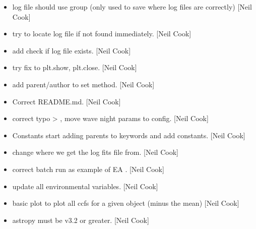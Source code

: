 \documentclass[a4paper,10pt,english]{report}
\begin{document}
\begin{itemize}
\item {} 
 log file should use group (only used to save where log
files are correctly) {[}Neil Cook{]}

\item {} 
 \sphinxhyphen{} try to locate log file if not
found immediately. {[}Neil Cook{]}

\item {} 
 \sphinxhyphen{} add check if log file exists.
{[}Neil Cook{]}

\item {} 
 \sphinxhyphen{} try fix to plt.show, plt.close. {[}Neil Cook{]}

\item {} 
 \sphinxhyphen{} add parent/author to set
method. {[}Neil Cook{]}

\item {} 
Correct README.md. {[}Neil Cook{]}

\item {} 
 \sphinxhyphen{} correct typo  \textendash{}\textgreater{} , move
wave night params to config. {[}Neil Cook{]}

\item {} 
Constants \sphinxhyphen{} start adding parents to keywords and add 
constants. {[}Neil Cook{]}

\item {} 
 \sphinxhyphen{} change where we get the log
fits file from. {[}Neil Cook{]}

\item {} 
 \sphinxhyphen{} correct batch run as example of
EA . {[}Neil Cook{]}

\item {} 
 \sphinxhyphen{} update all environmental variables. {[}Neil
Cook{]}

\item {} 
 \sphinxhyphen{} basic plot to plot all ccfs for a given
object (minus the mean) {[}Neil Cook{]}

\item {} 
 \sphinxhyphen{} astropy must be v3.2 or greater. {[}Neil Cook{]}


\end{itemize}
\end{document}
